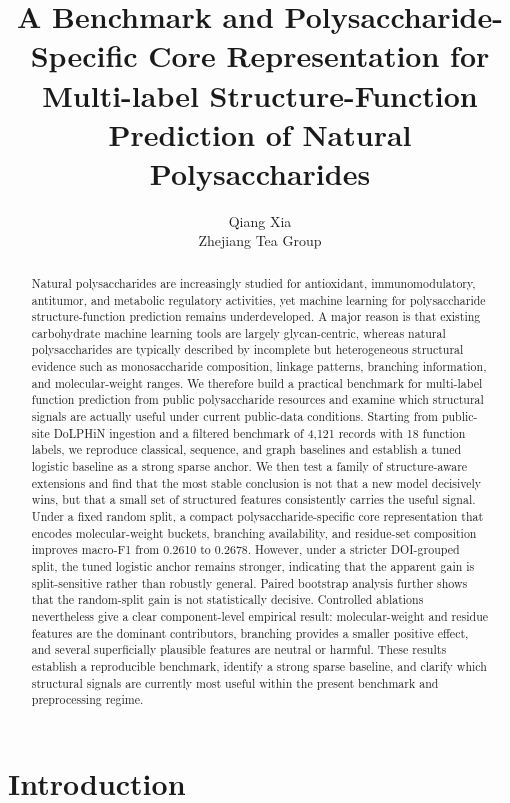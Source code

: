 \documentclass{article}
\title{A Benchmark and Polysaccharide-Specific Core Representation for Multi-label Structure-Function Prediction of Natural Polysaccharides}
\author{Qiang Xia\\Zhejiang Tea Group}
\date{}
\begin{document}
\maketitle

\begin{abstract}
Natural polysaccharides are increasingly studied for antioxidant, immunomodulatory, antitumor, and metabolic regulatory activities, yet machine learning for polysaccharide structure-function prediction remains underdeveloped. A major reason is that existing carbohydrate machine learning tools are largely glycan-centric, whereas natural polysaccharides are typically described by incomplete but heterogeneous structural evidence such as monosaccharide composition, linkage patterns, branching information, and molecular-weight ranges. We therefore build a practical benchmark for multi-label function prediction from public polysaccharide resources and examine which structural signals are actually useful under current public-data conditions. Starting from public-site DoLPHiN ingestion and a filtered benchmark of 4,121 records with 18 function labels, we reproduce classical, sequence, and graph baselines and establish a tuned logistic baseline as a strong sparse anchor. We then test a family of structure-aware extensions and find that the most stable conclusion is not that a new model decisively wins, but that a small set of structured features consistently carries the useful signal. Under a fixed random split, a compact polysaccharide-specific core representation that encodes molecular-weight buckets, branching availability, and residue-set composition improves macro-F1 from 0.2610 to 0.2678. However, under a stricter DOI-grouped split, the tuned logistic anchor remains stronger, indicating that the apparent gain is split-sensitive rather than robustly general. Paired bootstrap analysis further shows that the random-split gain is not statistically decisive. Controlled ablations nevertheless give a clear component-level empirical result: molecular-weight and residue features are the dominant contributors, branching provides a smaller positive effect, and several superficially plausible features are neutral or harmful. These results establish a reproducible benchmark, identify a strong sparse baseline, and clarify which structural signals are currently most useful within the present benchmark and preprocessing regime.
\end{abstract}

\section{Introduction}
\label{sec:intro}
\end{document}
